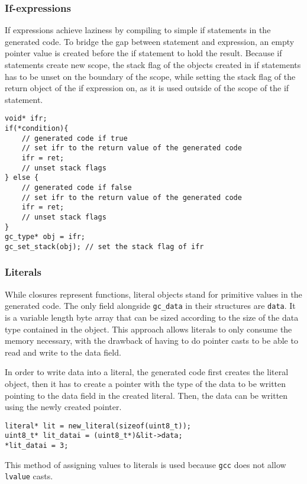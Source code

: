 \documentclass[12pt]{article}
\begin{document}
\subsubsection{If-expressions}

If expressions achieve laziness by compiling to simple if statements in the
generated code. To bridge the gap between statement and expression, an empty
pointer value is created before the if statement to hold the result. Because if
statements create new scope, the stack flag of the objects created in if
statements has to be unset on the boundary of the scope, while setting the stack
flag of the return object of the if expression on, as it is used outside of the
scope of the if statement.
\begin{lstlisting}
void* ifr;
if(*condition){
    // generated code if true
    // set ifr to the return value of the generated code
    ifr = ret;
    // unset stack flags
} else {
    // generated code if false
    // set ifr to the return value of the generated code
    ifr = ret;
    // unset stack flags
}
gc_type* obj = ifr;
gc_set_stack(obj); // set the stack flag of ifr
\end{lstlisting}

\subsubsection{Literals}

While closures represent functions, literal objects stand for primitive values
in the generated code. The only field alongside \verb$gc_data$ in their
structures are \verb$data$. It is a variable length byte array that can
be sized according to the size of the data type contained in the object. This
approach allows literals to only consume the memory necessary, with the drawback
of having to do pointer casts to be able to read and write to the data field.

In order to write data into a literal, the generated code first creates the
literal object, then it has to create a pointer with the type of the data to be
written pointing to the data field in the created literal. Then, the data can be
written using the newly created pointer.
\begin{lstlisting}
literal* lit = new_literal(sizeof(uint8_t));
uint8_t* lit_datai = (uint8_t*)&lit->data;
*lit_datai = 3;
\end{lstlisting}
This method of assigning values to literals is used because \verb$gcc$ does not
allow \verb$lvalue$ casts.
\end{document}
